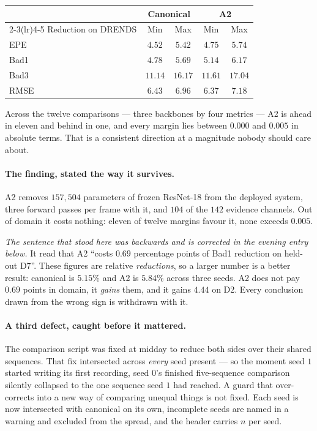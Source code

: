 \documentclass[11pt,a4paper]{article}
\begin{document}
\begin{center}
\begin{tabular}{lcccc}
\toprule
& \multicolumn{2}{c}{Canonical} & \multicolumn{2}{c}{A2} \\
\cmidrule(lr){2-3}\cmidrule(lr){4-5}
Reduction on DRENDS & Min & Max & Min & Max \\
\midrule
EPE  & $4.52$ & $5.42$ & $4.75$ & $5.74$ \\
Bad1 & $4.78$ & $5.69$ & $5.14$ & $6.17$ \\
Bad3 & $11.14$ & $16.17$ & $11.61$ & $17.04$ \\
RMSE & $6.43$ & $6.96$ & $6.37$ & $7.18$ \\
\bottomrule
\end{tabular}
\end{center}

Across the twelve comparisons --- three backbones by four metrics --- A2
is ahead in eleven and behind in one, and every margin lies between
$0.000$ and $0.005$ in absolute terms. That is a consistent direction at a
magnitude nobody should care about.

\paragraph{The finding, stated the way it survives.} A2 removes
$157{,}504$ parameters of frozen ResNet-18 from the deployed system,
three forward passes per frame with it, and $104$ of the $142$ evidence
channels. Out of domain it costs nothing: eleven of twelve margins favour
it, none exceeds $0.005$.

\emph{The sentence that stood here was backwards and is corrected in the
evening entry below.} It read that A2 ``costs $0.69$ percentage points of
Bad1 reduction on held-out D7''. These figures are relative
\emph{reductions}, so a larger number is a better result: canonical is
$5.15\%$ and A2 is $5.84\%$ across three seeds. A2 does not pay $0.69$
points in domain, it \emph{gains} them, and it gains $4.44$ on D2. Every
conclusion drawn from the wrong sign is withdrawn with it.

\paragraph{A third defect, caught before it mattered.} The comparison
script was fixed at midday to reduce both sides over their shared
sequences. That fix intersected across \emph{every} seed present --- so
the moment seed $1$ started writing its first recording, seed $0$'s
finished five-sequence comparison silently collapsed to the one sequence
seed $1$ had reached. A guard that over-corrects into a new way of
comparing unequal things is not fixed. Each seed is now intersected with
canonical on its own, incomplete seeds are named in a warning and
excluded from the spread, and the header carries $n$ per seed.
\end{document}
